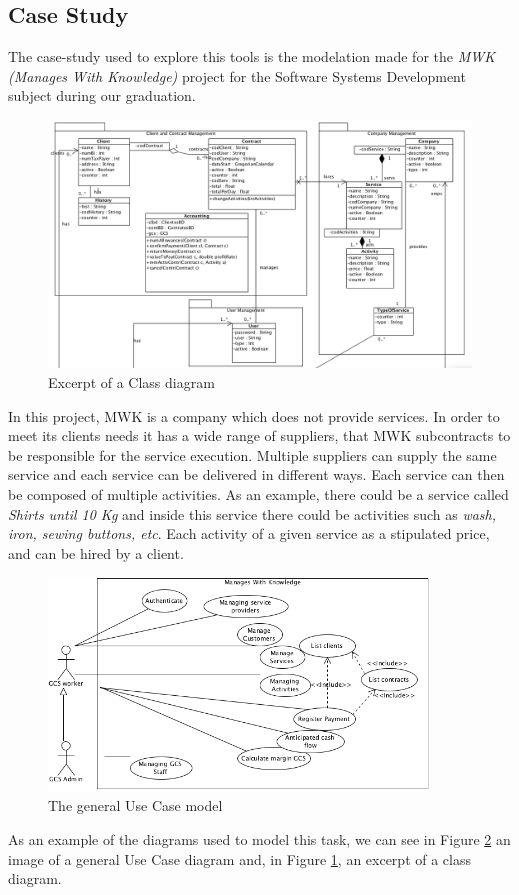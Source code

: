 \subsection*{Case Study}
The case-study used to explore this tools is the modelation made for the \textit{MWK (Manages With Knowledge)} project for the Software Systems Development subject during our graduation.

\begin{figure}[!htbp]
\begin{center}
\includegraphics[scale=0.345]{images/classbw.png}
\caption{Excerpt of a Class diagram}\label{fig:class}
\end{center}
\end{figure} 

In this project, MWK is a company which does not provide services. 
In order to meet its clients needs it has a wide range of suppliers, that MWK subcontracts to be responsible for the service execution.
Multiple suppliers can supply the same service and each  service can be delivered in different ways.
Each service can then be composed of multiple activities. As an example, there could be a service called \textit{Shirts until 10 Kg} and inside this service there could be activities such as \textit{wash, iron, sewing buttons, etc}.
Each activity of a given service as a stipulated price, and can be hired by a client.

\begin{figure}[!htbp]
\begin{center}
\includegraphics[width=0.9\textwidth]{images/usecase.png}
\caption{The general Use Case model}\label{fig:usecase}
\end{center}
\end{figure} 

As an example of the \umlS diagrams used to model this task, we can see in Figure \ref{fig:usecase} an image of a general Use Case diagram and, in Figure \ref{fig:class}, an excerpt of a class diagram.
